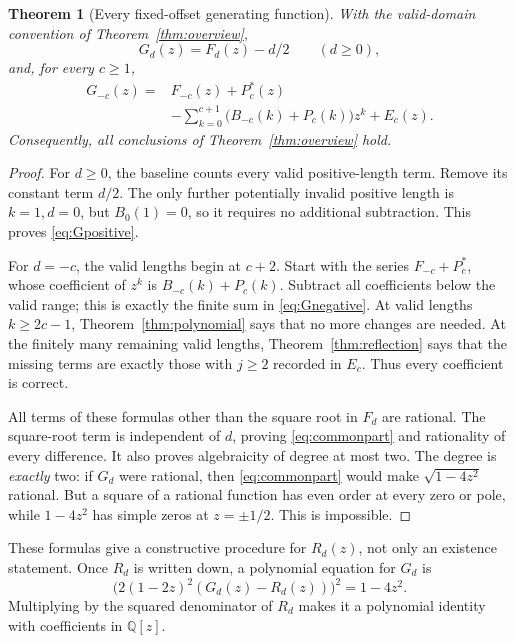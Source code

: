 \documentclass[11pt,letterpaper]{article}
\numberwithin{equation}{section}
\newtheorem{theorem}{Theorem}[section]
\theoremstyle{definition}
\newcommand{\Q}{\mathbb Q}
\begin{document}
\begin{theorem}[Every fixed-offset generating function]\label{thm:allgf}
With the valid-domain convention of Theorem~\ref{thm:overview},
\begin{equation}\label{eq:Gpositive}
G_d(z)=F_d(z)-d/2\qquad(d\ge0),
\end{equation}
and, for every $c\ge1$,
\begin{equation}\label{eq:Gnegative}
\begin{split}
G_{-c}(z)={}&F_{-c}(z)+P_c^*(z)\\
&-\sum_{k=0}^{c+1}\bigl(B_{-c}(k)+P_c(k)\bigr)z^k+E_c(z).
\end{split}
\end{equation}
Consequently, all conclusions of Theorem~\ref{thm:overview} hold.
\end{theorem}
\begin{proof}
For $d\ge0$, the baseline counts every valid positive-length term.
Remove its constant term $d/2$.  The only further potentially invalid
positive length is $k=1,d=0$, but $B_0(1)=0$, so it requires no additional
subtraction.  This proves \eqref{eq:Gpositive}.

For $d=-c$, the valid lengths begin at $c+2$.  Start with the series
$F_{-c}+P_c^*$, whose coefficient of $z^k$ is
$B_{-c}(k)+P_c(k)$.  Subtract all coefficients below the valid range;
this is exactly the finite sum in \eqref{eq:Gnegative}.
At valid lengths $k\ge2c-1$, Theorem~\ref{thm:polynomial} says that no
more changes are needed.  At the finitely many remaining valid lengths,
Theorem~\ref{thm:reflection} says that the missing terms are exactly
those with $j\ge2$ recorded in $E_c$.  Thus every coefficient is correct.

All terms of these formulas other than the square root in $F_d$ are
rational.  The square-root term is independent of $d$, proving
\eqref{eq:commonpart} and rationality of every difference.
It also proves algebraicity of degree at most two.  The degree is
\emph{exactly} two: if $G_d$ were rational, then
\eqref{eq:commonpart} would make $\sqrt{1-4z^2}$ rational.
But a square of a rational function has even order at every zero or
pole, while $1-4z^2$ has simple zeros at $z=\pm1/2$.  This is impossible.
\end{proof}

These formulas give a constructive procedure for $R_d(z)$, not only an
existence statement.  Once $R_d$ is written down, a polynomial equation
for $G_d$ is
\begin{equation}\label{eq:quadratic}
\bigl(2(1-2z)^2(G_d(z)-R_d(z))\bigr)^2=1-4z^2.
\end{equation}
Multiplying by the squared denominator of $R_d$ makes it a polynomial
identity with coefficients in $\Q[z]$.
\end{document}
